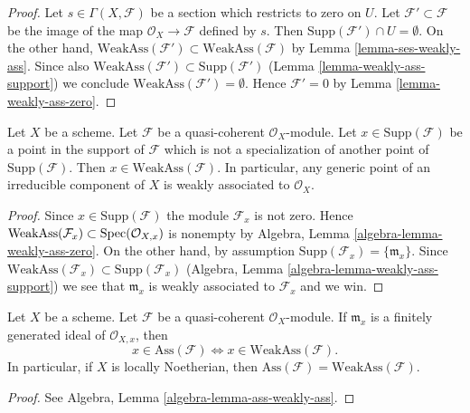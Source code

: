\begin{proof}
Let $s \in \Gamma(X, \mathcal{F})$ be a section which restricts to zero on $U$.
Let $\mathcal{F}' \subset \mathcal{F}$ be the image of the map
$\mathcal{O}_X \to \mathcal{F}$ defined by $s$. Then
$\text{Supp}(\mathcal{F}') \cap U = \emptyset$. On the other hand,
$\text{WeakAss}(\mathcal{F}') \subset \text{WeakAss}(\mathcal{F})$
by Lemma \ref{lemma-ses-weakly-ass}. Since also
$\text{WeakAss}(\mathcal{F}') \subset \text{Supp}(\mathcal{F}')$
(Lemma \ref{lemma-weakly-ass-support}) we conclude
$\text{WeakAss}(\mathcal{F}') = \emptyset$.
Hence $\mathcal{F}' = 0$ by Lemma \ref{lemma-weakly-ass-zero}.
\end{proof}

\begin{lemma}
\label{lemma-minimal-support-in-weakly-ass}
Let $X$ be a scheme.
Let $\mathcal{F}$ be a quasi-coherent $\mathcal{O}_X$-module.
Let $x \in \text{Supp}(\mathcal{F})$ be a point in the support
of $\mathcal{F}$ which is not a specialization of another point of
$\text{Supp}(\mathcal{F})$. Then
$x \in \text{WeakAss}(\mathcal{F})$.
In particular, any generic point of an irreducible component of $X$
is weakly associated to $\mathcal{O}_X$.
\end{lemma}

\begin{proof}
Since $x \in \text{Supp}(\mathcal{F})$ the module $\mathcal{F}_x$
is not zero. Hence
$\text{WeakAss}(\mathcal{F}_x) \subset \mathop{\mathrm{Spec}}(\mathcal{O}_{X, x})$
is nonempty by
Algebra, Lemma \ref{algebra-lemma-weakly-ass-zero}.
On the other hand, by assumption
$\text{Supp}(\mathcal{F}_x) = \{\mathfrak m_x\}$.
Since
$\text{WeakAss}(\mathcal{F}_x) \subset \text{Supp}(\mathcal{F}_x)$
(Algebra, Lemma \ref{algebra-lemma-weakly-ass-support})
we see that $\mathfrak m_x$ is weakly associated to $\mathcal{F}_x$
and we win.
\end{proof}

\begin{lemma}
\label{lemma-ass-weakly-ass}
Let $X$ be a scheme.
Let $\mathcal{F}$ be a quasi-coherent $\mathcal{O}_X$-module.
If $\mathfrak m_x$ is a finitely generated ideal of $\mathcal{O}_{X, x}$,
then
$$
x \in \text{Ass}(\mathcal{F}) \Leftrightarrow
x \in \text{WeakAss}(\mathcal{F}).
$$
In particular, if $X$ is locally Noetherian, then
$\text{Ass}(\mathcal{F}) = \text{WeakAss}(\mathcal{F})$.
\end{lemma}

\begin{proof}
See
Algebra, Lemma \ref{algebra-lemma-ass-weakly-ass}.
\end{proof}

